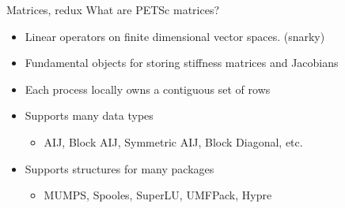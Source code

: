 \begin{frame}{Matrices, redux}
What are PETSc matrices?
\begin{itemize}
\item Linear operators on finite dimensional vector spaces. (snarky)
  \item<2> Fundamental objects for storing stiffness matrices and Jacobians
  \item<2> Each process locally owns a contiguous set of rows
  \item<2> Supports many data types
  \begin{itemize}
    \item AIJ, Block AIJ, Symmetric AIJ, Block Diagonal, etc.
  \end{itemize}
  \item<2> Supports structures for many packages
  \begin{itemize}
    \item MUMPS, Spooles, SuperLU, UMFPack, Hypre
  \end{itemize}
\end{itemize}
\end{frame}
